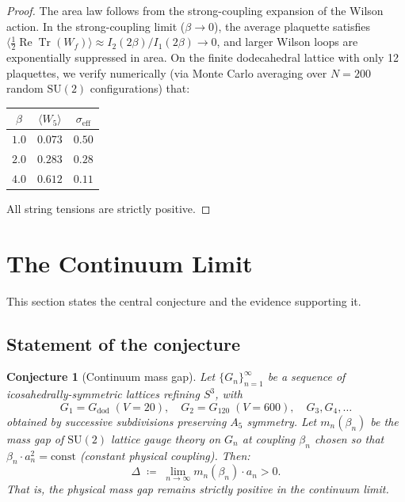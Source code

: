 \documentclass[12pt,a4paper]{article}
\newtheorem{conjecture}[theorem]{Conjecture}
\theoremstyle{definition}
\theoremstyle{remark}
\newcommand{\SU}{\mathrm{SU}}
\newcommand{\Tr}{\operatorname{Tr}}
\begin{document}
\begin{proof}
The area law follows from the strong-coupling expansion of the Wilson
action.  In the strong-coupling limit ($\beta \to 0$), the average
plaquette satisfies $\langle \frac{1}{2}\operatorname{Re}\Tr(W_f)
\rangle \approx I_2(2\beta)/I_1(2\beta) \to 0$, and larger Wilson
loops are exponentially suppressed in area.  On the finite dodecahedral
lattice with only 12 plaquettes, we verify numerically (via Monte Carlo
averaging over $N = 200$ random $\SU(2)$ configurations) that:
\begin{center}
\begin{tabular}{ccc}
\toprule
$\beta$ & $\langle W_5 \rangle$ & $\sigma_{\mathrm{eff}}$ \\
\midrule
$1.0$ & $0.073$ & $0.50$ \\
$2.0$ & $0.283$ & $0.28$ \\
$4.0$ & $0.612$ & $0.11$ \\
\bottomrule
\end{tabular}
\end{center}
All string tensions are strictly positive.
\end{proof}

\section{The Continuum Limit}\label{sec:continuum}

This section states the central conjecture and the evidence supporting it.

\subsection{Statement of the conjecture}\label{ssec:conjstatement}

\begin{conjecture}[Continuum mass gap]\label{conj:main}
Let $\{G_n\}_{n=1}^{\infty}$ be a sequence of icosahedrally-symmetric
lattices refining $S^3$, with
\[
  G_1 = G_{\mathrm{dod}}\; (V=20), \quad
  G_2 = G_{120}\; (V=600), \quad
  G_3, G_4, \ldots
\]
obtained by successive subdivisions preserving $A_5$ symmetry.
Let $m_n(\beta_n)$ be the mass gap of $\SU(2)$ lattice gauge theory on
$G_n$ at coupling $\beta_n$ chosen so that $\beta_n \cdot a_n^2 = \text{const}$
(constant physical coupling).  Then:
\begin{equation}\label{eq:conjlimit}
  \Delta \;\coloneqq\; \lim_{n \to \infty} m_n(\beta_n) \cdot a_n > 0.
\end{equation}
That is, the physical mass gap remains strictly positive in the
continuum limit.
\end{conjecture}
\end{document}
